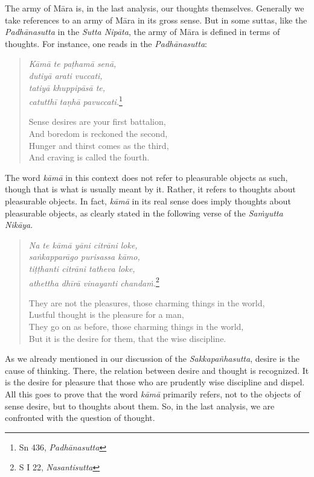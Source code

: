 The army of Māra is, in the last analysis, our thoughts themselves. Generally we take references to an army of Māra in its gross sense. But in some suttas, like the \emph{Padhānasutta} in the \emph{Sutta Nipāta}, the army of Māra is defined in terms of thoughts. For instance, one reads in the \emph{Padhānasutta}:

\begin{quote}
\emph{Kāmā te paṭhamā senā,}\\
\emph{dutiyā arati vuccati,}\\
\emph{tatiyā khuppipāsā te,}\\
\emph{catutthī taṇhā pavuccati.}\footnote{Sn 436, \emph{Padhānasutta}}

Sense desires are your first battalion,\\
And boredom is reckoned the second,\\
Hunger and thirst comes as the third,\\
And craving is called the fourth.
\end{quote}

The word \emph{kāmā} in this context does not refer to pleasurable objects as such, though that is what is usually meant by it. Rather, it refers to thoughts about pleasurable objects. In fact, \emph{kāmā} in its real sense does imply thoughts about pleasurable objects, as clearly stated in the following verse of the \emph{Saṁyutta Nikāya}.

\begin{quote}
\emph{Na te kāmā yāni citrāni loke,}\\
\emph{saṅkapparāgo purisassa kāmo,}\\
\emph{tiṭṭhanti citrāni tatheva loke,}\\
\emph{athettha dhīrā vinayanti chandaṁ.}\footnote{S I 22, \emph{Nasantisutta}}

They are not the pleasures, those charming things in the world,\\
Lustful thought is the pleasure for a man,\\
They go on as before, those charming things in the world,\\
But it is the desire for them, that the wise discipline.
\end{quote}

As we already mentioned in our discussion of the \emph{Sakkapañhasutta}, desire is the cause of thinking. There, the relation between desire and thought is recognized. It is the desire for pleasure that those who are prudently wise discipline and dispel. All this goes to prove that the word \emph{kāmā} primarily refers, not to the objects of sense desire, but to thoughts about them. So, in the last analysis, we are confronted with the question of thought.


